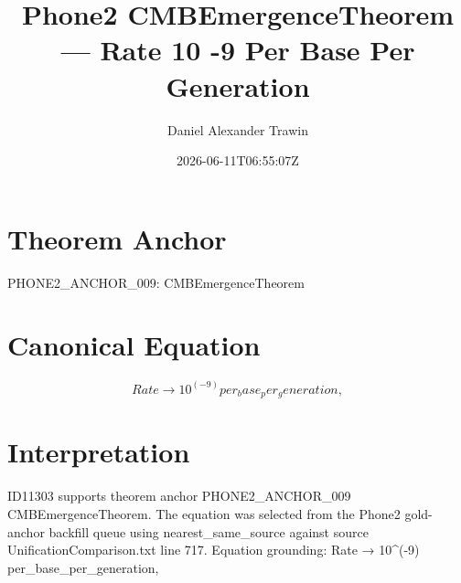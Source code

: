 \documentclass[11pt]{article}
\title{Phone2 CMBEmergenceTheorem — Rate 10 -9 Per Base Per Generation}
\author{Daniel Alexander Trawin}
\date{2026-06-11T06:55:07Z}
\begin{document}
\maketitle
\section*{Theorem Anchor}
PHONE2_ANCHOR_009: CMBEmergenceTheorem
\section*{Canonical Equation}
\[
Rate → 10^(-9) per_base_per_generation,
\]
\section*{Interpretation}
ID11303 supports theorem anchor PHONE2_ANCHOR_009 CMBEmergenceTheorem. The equation was selected from the Phone2 gold-anchor backfill queue using nearest_same_source against source UnificationComparison.txt line 717. Equation grounding: Rate → 10^(-9) per_base_per_generation,
\end{document}
